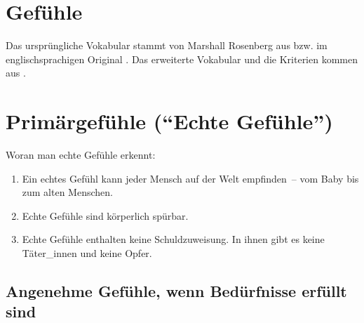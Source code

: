 \section{Gefühle}
\label{gefuehle}

Das ursprüngliche Vokabular stammt von Marshall Rosenberg aus \cite[S. 216]{gfk-rosenberg} bzw. im englischsprachigen Original \cite[S. 210]{nvc-rosenberg}. Das erweiterte Vokabular und die Kriterien kommen aus \cite[S. 56f]{gfk-dummies}.


\section{Primärgefühle ("`Echte Gefühle"')}

Woran man echte Gefühle erkennt:

\begin{enumerate}
 \item Ein echtes Gefühl kann jeder Mensch auf der Welt empfinden~-- vom Baby bis zum alten Menschen.
 \item Echte Gefühle sind körperlich spürbar.
 \item Echte Gefühle enthalten keine Schuldzuweisung. In ihnen gibt es keine Täter\_innen und keine Opfer.
\end{enumerate}

\subsection{Angenehme Gefühle, wenn Bedürfnisse erfüllt sind}

